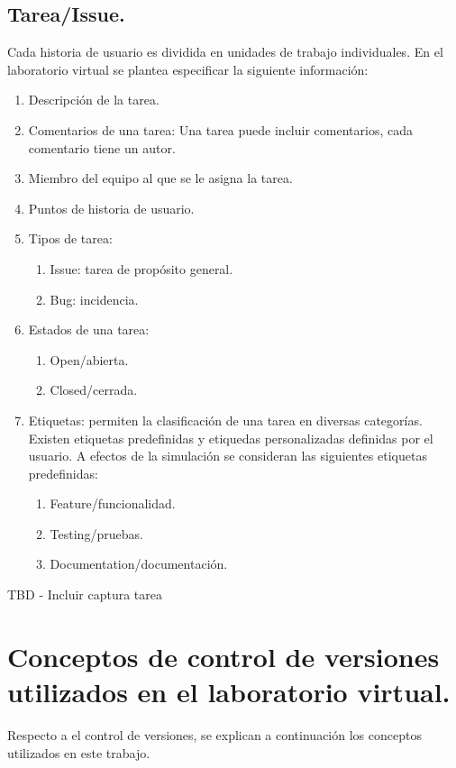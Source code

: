 \subsection{Tarea/Issue.}

Cada historia de usuario es dividida en unidades de trabajo individuales. En el laboratorio virtual se plantea especificar la siguiente información:

\begin{enumerate}
	\item Descripción de la tarea.
	\item Comentarios de una tarea: Una tarea puede incluir comentarios, cada comentario tiene un autor.
	\item Miembro del equipo al que se le asigna la tarea.
	\item Puntos de historia de usuario.
	\item Tipos de tarea:
		\begin{enumerate}
			\item Issue: tarea de propósito general.
			\item Bug: incidencia.
		\end{enumerate}
	\item Estados de una tarea:
		\begin{enumerate}
			\item Open/abierta.
			\item Closed/cerrada.
		\end{enumerate}
	\item Etiquetas: permiten la clasificación de una tarea en diversas categorías. Existen etiquetas predefinidas y etiquedas personalizadas definidas por el usuario. A efectos de la simulación se consideran las siguientes etiquetas predefinidas:	
		\begin{enumerate}
			\item Feature/funcionalidad.
			\item Testing/pruebas.
			\item Documentation/documentación.
		\end{enumerate}
\end{enumerate}

TBD - Incluir captura tarea

\section{Conceptos de control de versiones utilizados en el laboratorio virtual.}

Respecto a el control de versiones, se explican a continuación los conceptos utilizados en este trabajo.


